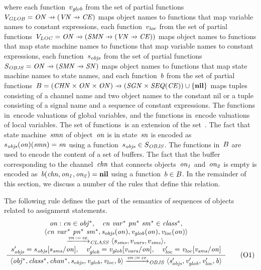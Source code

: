 \noindent
where each function~$v_{\it{glob}}$ from the set of partial functions~$\VGLOB = \ObjectNames \pfun (\VariableNames \pfun \ConstantExpressions)$ maps object names to functions that map variable names to constant expressions,
each function~$v_{\it{loc}}$ from the set of partial functions~$\VLOC = \ObjectNames \pfun (\StateMachineNames \pfun (\VariableNames \pfun \ConstantExpressions))$ maps object names to functions that map state machine names to functions that map variable names to constant expressions,
each function~$s_{\it{objs}}$ from the set of partial functions~$\SOBJS = \ObjectNames \pfun (\StateMachineNames \pfun \StateNames)$ maps object names to functions that map state machine names to state names,
and each function~$b$ from the set of partial functions~$\Buf = (\ChannelNames \times \ObjectNames \times \ObjectNames) \pfun (\SignalNames \times {\it SEQ}(\ConstantExpressions)) \cup \{\nil\}$ maps tuples consisting of a channel name and two object names to the constant nil or a tuple consisting of a signal name and a sequence of constant expressions.
The functions in~\VGLOB encode valuations of global variables, and the functions in~\VLOC encode valuations of local variables.
The set of functions~\SOBJS is an extension of the set~\SSMS.
The fact that state machine~$\it{smn}$ of object~$\it{on}$ is in state~$\it{sn}$ is encoded as~$s_{\it{objs}}(\it{on})(\it{smn}) = \it{sn}$ using a function~$s_{\it{objs}} \in S_{\it{OBJS}}$.
The functions in~$B$ are used to encode the content of a set of buffers.
The fact that the buffer corresponding to the channel~$\it{chn}$ that connects objects~$\it{on_1}$ and~$\it{on_2}$ is empty is encoded as~$b(\it{chn}, \it{on_1}, \it{on_2}) = \mathbf{nil}$ using a function~$b \in B$.
In the remainder of this section, we discuss a number of the rules that define this relation.

The following rule defines the part of the semantics of sequences of objects related to assignment statements.
%
\begin{equation*}
 \frac{ \begin{array}[c]{c} 
\it{on}:\it{cn} \in \it{obj^*}, \quad
\it{cn}~\it{var^*}~\it{pn^*}~\it{sm^*} \in \it{class^*}, \\
\langle \it{cn}~\it{var^*}~\it{pn^*}~\it{sm^*}, s_{\it{objs}}(\it{on}), v_{\it{glob}}(\it{on}), v_{\it{loc}}(\it{on}) \rangle \\
\xrightarrow{\it{\it{vn} \operatorname*{:=}\it{ce}}}_{\it{CLASS}}
\langle s_{\it{sms}}, v_{\it{vars}}, v_{\it{sms}} \rangle, \\
s_{\it{objs}}' = s_{\it{objs}}[s_{\it{sms}}/\it{on}], \quad
v_{\it{glob}}' = v_{\it{glob}}[v_{\it{vars}}/\it{on}], \quad
v_{\it{loc}}' = v_{\it{loc}}[v_{\it{sms}}/\it{on}]
 \end{array} }{ \begin{array}[c]{c} 
\langle \it{obj^*}, \it{class^*}, \it{chan^*}, s_{\it{objs}}, v_{\it{glob}}, v_{\it{loc}}, b \rangle
\xrightarrow{\it{\it{vn} \operatorname*{:=}\it{ce}}}_{\it{OBJS}}
\langle s_{\it{objs}}', v_{\it{glob}}', v_{\it{loc}}', b \rangle
 \end{array} } 
\tag{O1}
\label{eq:sos-slco:object-assign}
\end{equation*}

